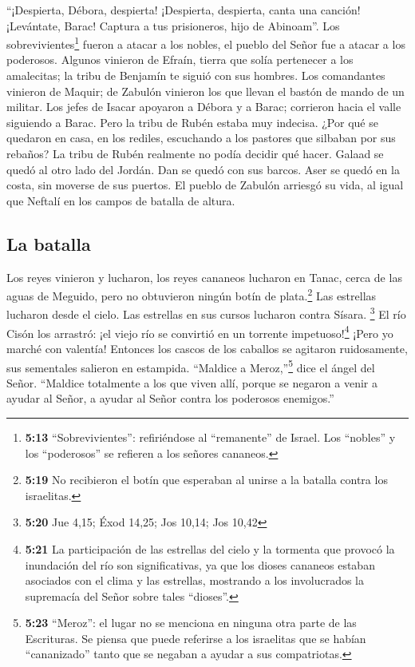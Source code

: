  ``¡Despierta, Débora, despierta! ¡Despierta, despierta,
canta una canción! ¡Levántate, Barac! Captura a tus prisioneros, hijo de
Abinoam''.  Los sobrevivientes\footnote{\textbf{5:13}
  ``Sobrevivientes'': refiriéndose al ``remanente'' de Israel. Los
  ``nobles'' y los ``poderosos'' se refieren a los señores cananeos.}
fueron a atacar a los nobles, el pueblo del Señor fue a atacar a los
poderosos.  Algunos vinieron de Efraín, tierra que solía
pertenecer a los amalecitas; la tribu de Benjamín te siguió con sus
hombres. Los comandantes vinieron de Maquir; de Zabulón vinieron los que
llevan el bastón de mando de un militar.  Los jefes de
Isacar apoyaron a Débora y a Barac; corrieron hacia el valle siguiendo a
Barac. Pero la tribu de Rubén estaba muy indecisa.  ¿Por
qué se quedaron en casa, en los rediles, escuchando a los pastores que
silbaban por sus rebaños? La tribu de Rubén realmente no podía decidir
qué hacer.  Galaad se quedó al otro lado del Jordán. Dan
se quedó con sus barcos. Aser se quedó en la costa, sin moverse de sus
puertos.  El pueblo de Zabulón arriesgó su vida, al igual
que Neftalí en los campos de batalla de altura.

\hypertarget{la-batalla}{%
\subsection{La batalla}\label{la-batalla}}

 Los reyes vinieron y lucharon, los reyes cananeos
lucharon en Tanac, cerca de las aguas de Meguido, pero no obtuvieron
ningún botín de plata.\footnote{\textbf{5:19} No recibieron el botín que
  esperaban al unirse a la batalla contra los israelitas.}
 Las estrellas lucharon desde el cielo. Las estrellas en
sus cursos lucharon contra Sísara. \footnote{\textbf{5:20} Jue 4,15;
  Éxod 14,25; Jos 10,14; Jos 10,42}  El río Cisón los
arrastró: ¡el viejo río se convirtió en un torrente
impetuoso!\footnote{\textbf{5:21} La participación de las estrellas del
  cielo y la tormenta que provocó la inundación del río son
  significativas, ya que los dioses cananeos estaban asociados con el
  clima y las estrellas, mostrando a los involucrados la supremacía del
  Señor sobre tales ``dioses''.} ¡Pero yo marché con valentía!
 Entonces los cascos de los caballos se agitaron
ruidosamente, sus sementales salieron en estampida. 
``Maldice a Meroz,''\footnote{\textbf{5:23} ``Meroz'': el lugar no se
  menciona en ninguna otra parte de las Escrituras. Se piensa que puede
  referirse a los israelitas que se habían ``cananizado'' tanto que se
  negaban a ayudar a sus compatriotas.} dice el ángel del Señor.
``Maldice totalmente a los que viven allí, porque se negaron a venir a
ayudar al Señor, a ayudar al Señor contra los poderosos enemigos.''

